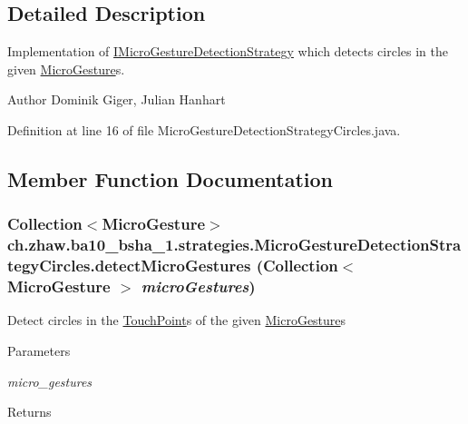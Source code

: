 \subsection{Detailed Description}
Implementation of \hyperlink{interfacech_1_1zhaw_1_1ba10__bsha__1_1_1strategies_1_1IMicroGestureDetectionStrategy}{IMicroGestureDetectionStrategy} which detects circles in the given \hyperlink{}{MicroGesture}s.

\begin{DoxyAuthor}{Author}
Dominik Giger, Julian Hanhart 
\end{DoxyAuthor}


Definition at line 16 of file MicroGestureDetectionStrategyCircles.java.

\subsection{Member Function Documentation}
\hypertarget{classch_1_1zhaw_1_1ba10__bsha__1_1_1strategies_1_1MicroGestureDetectionStrategyCircles_a1ce3987ae892eba2d0cf644a111933d3}{
\subsubsection[{detectMicroGestures}]{\setlength{\rightskip}{0pt plus 5cm}Collection$<${\bf MicroGesture}$>$ ch.zhaw.ba10\_\-bsha\_\-1.strategies.MicroGestureDetectionStrategyCircles.detectMicroGestures (Collection$<$ {\bf MicroGesture} $>$ {\em microGestures})}}
\label{classch_1_1zhaw_1_1ba10__bsha__1_1_1strategies_1_1MicroGestureDetectionStrategyCircles_a1ce3987ae892eba2d0cf644a111933d3}
Detect circles in the \hyperlink{classch_1_1zhaw_1_1ba10__bsha__1_1_1TouchPoint}{TouchPoint}s of the given \hyperlink{}{MicroGesture}s


\begin{DoxyParams}{Parameters}
\item[{\em micro\_\-gestures}]\end{DoxyParams}
\begin{DoxyReturn}{Returns}

\end{DoxyReturn}


